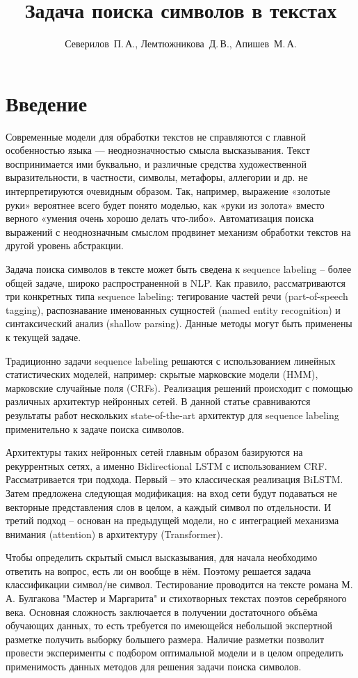 \documentclass[12pt,twoside]{article}
\title
    [Задача поиска символов в текстах] %
    {Задача поиска символов в текстах}
\author
    [Северилов~П.\,А.] %
    {Северилов~П.\,А., Лемтюжникова~Д.\,В., Апишев~М.\,А.} %
    [Северилов~П.\,А.$^1$, Лемтюжникова~Д.\,В.$^1$, Апишев~М.\,А.$^2$] %
\begin{document}
\maketitle
\section{Введение}
Современные модели для обработки текстов не справляются с главной особенностью языка — неоднозначностью смысла высказывания. Текст воспринимается ими буквально, и различные средства художественной выразительности, в частности, символы, метафоры, аллегории и др. не интерпретируются очевидным образом. Так, например, выражение «золотые руки» вероятнее всего будет понято моделью, как «руки из золота» вместо верного «умения очень хорошо делать что-либо». Автоматизация поиска выражений с неоднозначным смыслом продвинет механизм обработки текстов на другой уровень абстракции.

Задача поиска символов в тексте может быть сведена к sequence labeling -- более общей задаче, широко распространенной в NLP. Как правило, рассматриваются три конкретных типа sequence labeling: тегирование частей речи (part-of-speech tagging), распознавание именованных сущностей (named entity recognition) и синтаксический анализ (shallow parsing). Данные методы могут быть применены к текущей задаче.

Традиционно задачи sequence labeling решаются с использованием линейных статистических моделей, например: скрытые марковские модели (HMM), марковские случайные поля (CRFs). Реализация решений происходит с помощью различных архитектур нейронных сетей. В данной статье сравниваются результаты работ нескольких state-of-the-art архитектур для sequence labeling применительно к задаче поиска символов. 

Архитектуры таких нейронных сетей главным образом базируются на рекуррентных сетях, а именно Bidirectional LSTM с использованием CRF. Рассматривается три подхода. Первый -- это классическая реализация BiLSTM. Затем предложена следующая модификация: на вход сети будут подаваться не векторные представления слов в целом, а каждый символ по отдельности. И третий подход -- основан на предыдущей модели, но с интеграцией механизма внимания (attention) в архитектуру (Transformer).

Чтобы определить скрытый смысл высказывания, для начала необходимо ответить на вопрос, есть ли он вообще в нём. Поэтому решается задача классификации символ/не символ. Тестирование проводится на тексте романа М. А. Булгакова "Мастер и Маргарита" и стихотворных текстах поэтов серебряного века. Основная сложность заключается в получении достаточного объёма обучающих данных, то есть требуется по имеющейся небольшой экспертной разметке получить выборку большего размера. Наличие разметки позволит провести эксперименты с подбором оптимальной модели и в целом определить применимость данных методов для решения задачи поиска символов.
\end{document}

